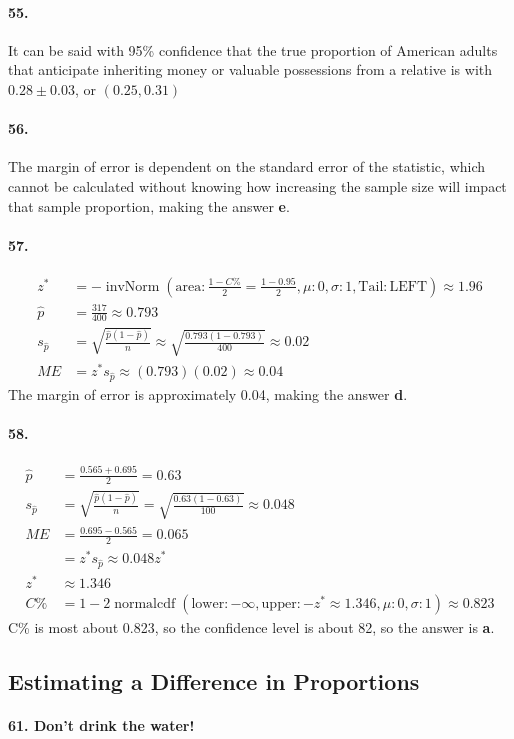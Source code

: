 \documentclass[12pt, A4]{article}
\DeclareMathOperator{\invNorm}{invNorm}
\DeclareMathOperator{\normalcdf}{normalcdf}
\newcommand{\invNormal}[4]{\invNorm\left(\mathrm{area}:#1, \mu: #2, \sigma: #3, \mathrm{Tail: #4}\right)}
\newcommand{\normalCDF}[4]{\normalcdf\left(\mathrm{lower}: #1, \mathrm{upper}: #2, \mu: #3, \sigma: #4\right)}
\newcommand{\propse}[2]{\sqrt{\frac{#1\left(1 - #1\right)}{#2}}}
\begin{document}
		\paragraph{55.}
			It can be said with 95\% confidence that the true proportion of American adults that anticipate inheriting money or valuable possessions from a relative is with $0.28 \pm 0.03$, or $(0.25, 0.31)$
		\paragraph{56.}
			The margin of error is dependent on the standard error of the statistic, which cannot be calculated without knowing how increasing the sample size will impact that sample proportion, making the answer \textbf{e}.
		\paragraph{57.}
			\begin{align*}
				z^* &= -\invNormal{\frac{1 - C\%}{2} = \frac{1 - 0.95}{2}}{0}{1}{LEFT} \approx 1.96 \\
				\hat{p} &= \frac{317}{400} \approx 0.793 \\
				s_{\hat{p}} &= \propse{\hat{p}}{n} \approx \propse{0.793}{400} \approx 0.02  \\
				ME &= z^*s_{\hat{p}} \approx (0.793)(0.02) \approx 0.04
			\end{align*}
			The margin of error is approximately 0.04, making the answer \textbf{d}.
		\paragraph{58.}
			\begin{align*}
				\hat{p} &= \frac{0.565 + 0.695}{2} = 0.63 \\
				s_{\hat{p}} &= \sqrt{\frac{\hat{p}(1 - \hat{p})}{n}} = \sqrt{\frac{0.63(1 - 0.63)}{100}} \approx 0.048 \\
				ME &= \frac{0.695 - 0.565}{2} = 0.065 \\
					&= z^*s_{\hat{p}} \approx 0.048z^* \\
				z^* &\approx 1.346 \\
				C\% &= 1 - 2\normalCDF{-\infty}{-z^* \approx 1.346}{0}{1} \approx 0.823
			\end{align*}
			C\% is most about 0.823, so the confidence level is about 82, so the answer is \textbf{a}.
	\subsection{Estimating a Difference in Proportions}
		\paragraph{61. Don't drink the water!}
\end{document}

